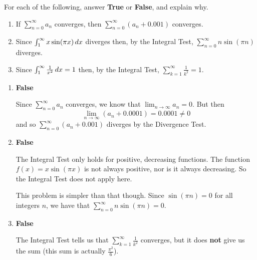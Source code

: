 \documentclass[]{ximera}
\begin{document}
\begin{problem}
For each of the following, answer {\bf True} or {\bf False}, and explain why.
	\begin{enumerate}
	
	\item  If $\sum_{n=0}^\infty a_n$ converges, then $\sum_{n=0}^\infty (a_n + 0.001)$ converges.
	
	\item  Since $\int_1^\infty x \sin(\pi x) \,d x$ diverges then, by the Integral Test, $\sum_{n=0}^\infty n \sin(\pi n)$ diverges.
	
	\item  Since $\int_1^\infty \frac{1}{x^2} \,d x = 1$ then, by the Integral Test, $\sum_{k=1}^\infty \frac{1}{k^2} = 1$.  
	
	\end{enumerate}
	
	\begin{freeResponse}
		\begin{enumerate}
		
		\item  {\bf False}
		
		Since $\sum_{n=0}^\infty a_n$ converges, we know that $\lim_{n \to \infty} a_n = 0$.  
		But then 
			\[
			\lim_{n \to \infty} (a_n + 0.0001) = 0.0001 \neq 0
			\]
		and so $\sum_{n=0}^\infty (a_n + 0.001)$ diverges by the Divergence Test.
		
		
		
		\item  {\bf False}
		
		The Integral Test only holds for positive, decreasing functions.  
		The function $f(x)= x \sin(\pi x)$ is not always positive, nor is it always decreasing.  
		So the Integral Test does not apply here.
		
		This problem is simpler than that though.  
		Since $\sin(\pi n) = 0$ for all integers $n$, we have that $\sum_{n=0}^\infty n \sin(\pi n) = 0$.
		
		
		
		\item  {\bf False}
		
		The Integral Test tells us that $\sum_{k=1}^\infty \frac{1}{k^2}$ converges, but it does {\bf not} give us the sum (this sum is actually $\frac{\pi^2}{6}$).  
		
		\end{enumerate}
	\end{freeResponse}
	
\end{problem}
\end{document}
